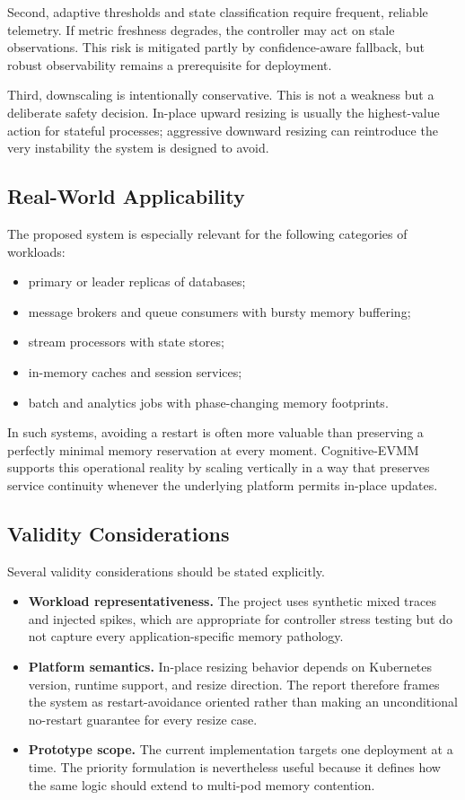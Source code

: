 \documentclass[12pt,a4paper]{article}
\begin{document}
Second, adaptive thresholds and state classification require frequent, reliable telemetry. If metric freshness degrades, the controller may act on stale observations. This risk is mitigated partly by confidence-aware fallback, but robust observability remains a prerequisite for deployment.

Third, downscaling is intentionally conservative. This is not a weakness but a deliberate safety decision. In-place upward resizing is usually the highest-value action for stateful processes; aggressive downward resizing can reintroduce the very instability the system is designed to avoid.

\subsection{Real-World Applicability}

The proposed system is especially relevant for the following categories of workloads:
\begin{itemize}
    \item primary or leader replicas of databases;
    \item message brokers and queue consumers with bursty memory buffering;
    \item stream processors with state stores;
    \item in-memory caches and session services;
    \item batch and analytics jobs with phase-changing memory footprints.
\end{itemize}

In such systems, avoiding a restart is often more valuable than preserving a perfectly minimal memory reservation at every moment. Cognitive-EVMM supports this operational reality by scaling vertically in a way that preserves service continuity whenever the underlying platform permits in-place updates.

\subsection{Validity Considerations}

Several validity considerations should be stated explicitly.
\begin{itemize}
    \item \textbf{Workload representativeness.} The project uses synthetic mixed traces and injected spikes, which are appropriate for controller stress testing but do not capture every application-specific memory pathology.
    \item \textbf{Platform semantics.} In-place resizing behavior depends on Kubernetes version, runtime support, and resize direction. The report therefore frames the system as restart-avoidance oriented rather than making an unconditional no-restart guarantee for every resize case.
    \item \textbf{Prototype scope.} The current implementation targets one deployment at a time. The priority formulation is nevertheless useful because it defines how the same logic should extend to multi-pod memory contention.
\end{itemize}
\end{document}
